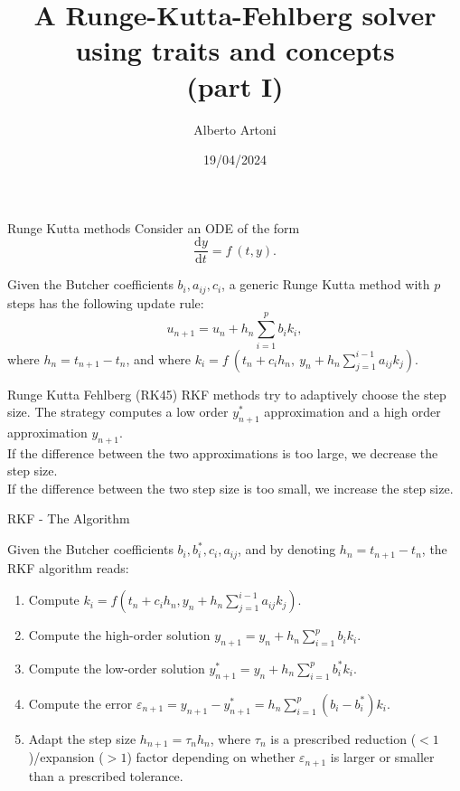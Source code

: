 \documentclass[10pt,aspectratio=169]{beamer}
\begin{document}
    \title{A Runge-Kutta-Fehlberg solver\protect\\using traits and concepts\protect\\(part I)}
    \author{Alberto Artoni}
    \date{19/04/2024}

\begin{frame}
    \maketitle
\end{frame}

\begin{frame}{Runge Kutta methods}
Consider an ODE of the form
\begin{equation*}
	\frac{\mathrm{d} y}{\mathrm{d} t} = f\ (t, y).
\end{equation*}

Given the Butcher coefficients $b_i, a_{ij}, c_i$, a generic Runge Kutta method with $p$ steps has the following update rule:
\begin{equation*}
u_{n+1} = u_{n} + h_n \sum_{i=1}^p b_i k_i,
\end{equation*}
where $h_n = t_{n+1} - t_n$, and where
$	k_i = f\ (t_n + c_i h_n, \ y_n + h_n\sum_{j=1}^{i-1}a_{ij}k_j).
$
\end{frame}

\begin{frame}{Runge Kutta Fehlberg (RK45)}
	RKF methods try to adaptively choose the step size. The strategy computes a low order $y^*_{n+1}$ approximation and a high order approximation  $y_{n+1}$. \\
	If the difference between the two approximations is too large, we decrease the step size. \\
	If the difference between the two step size is too small, we increase the step size.
	\end{frame}
	
\begin{frame}{RKF - The Algorithm}
	
	Given the Butcher coefficients $b_i, b_i^*, c_i, a_{ij}$, and by denoting $h_n = t_{n+1} - t_n$, the RKF algorithm reads:
		
	\begin{enumerate}
		\item Compute $k_i = f\left(t_n + c_i h_n, y_n + h_n\sum_{j=1}^{i-1}a_{ij}k_j\right)$.
		\item Compute the high-order solution \(y_{n+1} = y_{n} + h_n \sum_{i=1}^p b_i k_i\).
		\item Compute the low-order solution \(y_{n+1}^* = y_{n} + h_n \sum_{i=1}^p b_i^* k_i\).
		\item Compute the error \(\varepsilon_{n+1} = y_{n+1} - y_{n+1}^* = h_n \sum_{i=1}^p(b_i - b_i^*)k_i\).
		\item Adapt the step size \(h_{n+1} = \tau_{n} h_{n}\), where \(\tau_{n}\) is a prescribed reduction (\(<1\))/expansion (\(>1\)) factor depending on whether \(\varepsilon_{n+1}\) is larger or smaller than a prescribed tolerance.
	\end{enumerate}
\end{frame}
\end{document}
